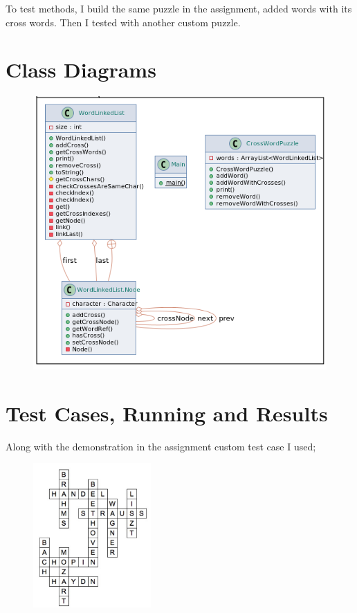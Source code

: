 \documentclass[a4paper]{article}
\begin{document}
\begin{large}
To test methods, I build the same puzzle in the assignment, added words with its cross words. Then I tested with another custom puzzle.


\newpage

\section{Class Diagrams}

\vspace{1em}

\begin{figure}[htp]
  \centering
  \includegraphics[width=\textwidth]{class-diagram-3}
\end{figure}

\newpage

\section{Test Cases, Running and Results}

Along with the demonstration in the assignment custom test case I used;

\begin{figure}[htp]
  \centering
  \includegraphics[width=0.4\textwidth]{crossword}
\end{figure}



\end{large}
\end{document}

